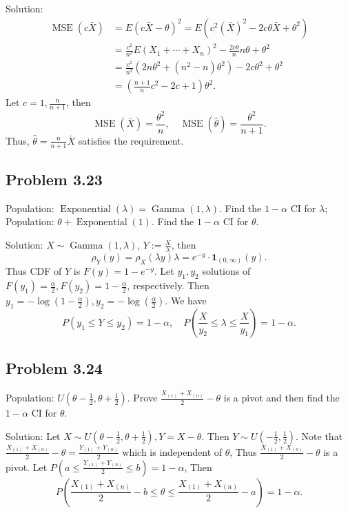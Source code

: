 {Solution:}
\begin{align*}
\operatorname{MSE}(c\bar{X})&=E(c\bar{X}-\theta)^{2}=E\left(c^{2}(\bar{X})^{2}-2c\theta\bar{X}+\theta^{2}\right)\\
&=\frac{c^{2}}{n^{2}}E\left(X_{1}+\cdots+X_{n}\right)^{2}-\frac{2c\theta}{n}n\theta+\theta^{2}\\
&=\frac{c^{2}}{n^{2}}\left(2n\theta^{2}+\left(n^{2}-n\right)\theta^{2}\right)-2c\theta^{2}+\theta^{2}\\
&=\left(\frac{n+1}{n}c^{2}-2c+1\right)\theta^{2}.
\end{align*}
Let $c=1,\frac{n}{n+1}$, then
\[
\operatorname{MSE}(\bar{X})=\frac{\theta^{2}}{n},\quad \operatorname{MSE}(\hat{\theta})=\frac{\theta^{2}}{n+1}.
\]
Thus, $\hat{\theta}=\frac{n}{n+1}\bar{X}$ satisfies the requirement.

\subsection*{Problem 3.23}
Population: $\operatorname{Exponential}(\lambda) = \operatorname{Gamma}(1,\lambda)$. Find the $1-\alpha$ CI for $\lambda$;
Population: $\theta+\operatorname{Exponential}(1)$. Find the $1-\alpha$ CI for $\theta$.

{Solution:}
$X\sim\operatorname{Gamma}(1,\lambda)$, $Y:=\frac{X}{\lambda}$, then
\[
\rho_{Y}(y)=\rho_{X}(\lambda y)\lambda=e^{-y}\cdot\mathbf{1}_{(0,\infty)}(y).
\]
Thus CDF of $Y$ is $F(y)=1-e^{-y}$. Let $y_{1},y_{2}$ solutions of $F(y_{1})=\frac{\alpha}{2},F(y_{2})=1-\frac{\alpha}{2}$, respectively. 
Then $y_{1}=-\log\left(1-\frac{\alpha}{2}\right),y_{2}=-\log\left(\frac{\alpha}{2}\right)$. We have
\[
P\left(y_{1}\leq Y\leq y_{2}\right)=1-\alpha,\quad P\left(\frac{X}{y_{2}}\leq\lambda\leq\frac{X}{y_{1}}\right)=1-\alpha.
\]

\subsection*{Problem 3.24}
Population: $U\left(\theta-\frac{1}{2},\theta+\frac{1}{2}\right)$.
Prove $\frac{X_{(1)}+X_{(n)}}{2}-\theta$ is a pivot and then find the $1-\alpha$ CI for $\theta$.

{Solution:}
Let $X\sim U\left(\theta-\frac{1}{2},\theta+\frac{1}{2}\right),Y=X-\theta$. Then $Y\sim U\left(-\frac{1}{2},\frac{1}{2}\right)$. Note that $\frac{X_{(1)}+X_{(n)}}{2}-\theta=\frac{Y_{(1)}+Y_{(n)}}{2}$ which is independent of $\theta$, Thus $\frac{X_{(1)}+X_{(n)}}{2}-\theta$ is a pivot. Let $P\left(a\leq\frac{Y_{(1)}+Y_{(n)}}{2}\leq b\right)=1-\alpha$, Then
\[
P\left(\frac{X_{(1)}+X_{(n)}}{2}-b\leq\theta\leq\frac{X_{(1)}+X_{(n)}}{2}-a\right)=1-\alpha.
\]


